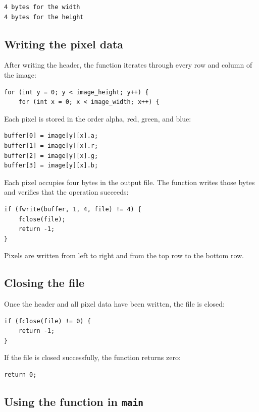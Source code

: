 \begin{verbatim}
4 bytes for the width
4 bytes for the height
\end{verbatim}

\subsection{Writing the pixel data}

After writing the header, the function iterates through every row and column of
the image:

\begin{lstlisting}
for (int y = 0; y < image_height; y++) {
    for (int x = 0; x < image_width; x++) {
\end{lstlisting}

Each pixel is stored in the order alpha, red, green, and blue:

\begin{lstlisting}
buffer[0] = image[y][x].a;
buffer[1] = image[y][x].r;
buffer[2] = image[y][x].g;
buffer[3] = image[y][x].b;
\end{lstlisting}

Each pixel occupies four bytes in the output file. The function writes those
bytes and verifies that the operation succeeds:

\begin{lstlisting}
if (fwrite(buffer, 1, 4, file) != 4) {
    fclose(file);
    return -1;
}
\end{lstlisting}

Pixels are written from left to right and from the top row to the bottom row.

\subsection{Closing the file}

Once the header and all pixel data have been written, the file is closed:

\begin{lstlisting}
if (fclose(file) != 0) {
    return -1;
}
\end{lstlisting}

If the file is closed successfully, the function returns zero:

\begin{lstlisting}
return 0;
\end{lstlisting}

\subsection{Using the function in \texttt{main}}

